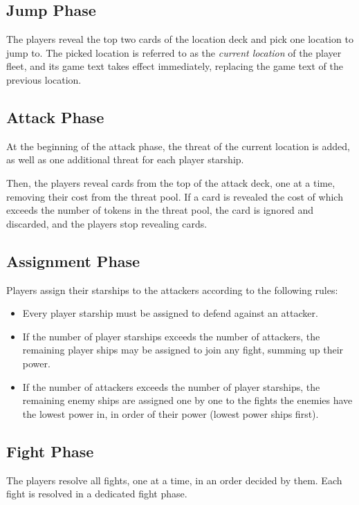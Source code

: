 \documentclass[11pt, a4paper]{article}
\begin{document}
\subsection{Jump Phase}

The players reveal the top two cards of the location deck and pick one location
to jump to. The picked location is referred to as the \emph{current location}
of the player fleet, and its game text takes effect immediately, replacing the
game text of the previous location.

\subsection{Attack Phase}

At the beginning of the attack phase, the threat of the current location is
added, as well as one additional threat for each player starship.

Then, the players reveal cards from the top of the attack deck, one at a time,
removing their cost from the threat pool. If a card is revealed the cost of
which exceeds the number of tokens in the threat pool, the card is ignored and
discarded, and the players stop revealing cards.

\subsection{Assignment Phase}

Players assign their starships to the attackers according to the following
rules:

\begin{itemize}
 \item Every player starship must be assigned to defend against an attacker.
 \item If the number of player starships exceeds the number of attackers, the
remaining player ships may be assigned to join any fight, summing up their
power.
 \item If the number of attackers exceeds the number of player starships, the
remaining enemy ships are assigned one by one to the fights the enemies have
the lowest power in, in order of their power (lowest power ships first).
\end{itemize}

\subsection{Fight Phase}

The players resolve all fights, one at a time, in an order decided by them.
Each fight is resolved in a dedicated fight phase.
\end{document}

